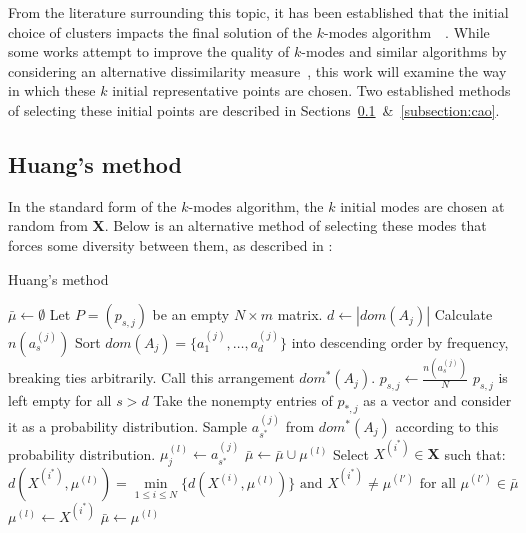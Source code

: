 From the literature surrounding this topic, it has been established that the 
initial choice of clusters impacts the final solution of the \(k\)-modes
algorithm~\cite{Huang98}~\cite{Cao09}. While some works attempt to improve the 
quality of \(k\)-modes and similar algorithms by considering an alternative 
dissimilarity measure~\cite{Ng07}, this work will examine the way in which these
\(k\) initial representative points are chosen. Two established methods of 
selecting these initial points are described in
Sections~\ref{subsection:huang}~\&~\ref{subsection:cao}.


\subsection{Huang's method}\label{subsection:huang}

In the standard form of the \(k\)-modes algorithm, the \(k\) initial modes are 
chosen at random from \textbf{X}. Below is an alternative method of selecting
these modes that forces some diversity between them, as described in 
\cite{Huang98}:

\begin{algorithm}[H]
\caption{Huang's method}\label{alg:huang}
    \begin{algorithmic}[0]
        \State \(\bar{\mu} \gets \emptyset\)
        \State Let \(P = (p_{s,j})\) be an empty \(N \times m\) matrix.
            \State \(d \gets |dom(A_j)|\)
                \State Calculate \(n(a_s^{(j)})\)
	        \EndFor
            \State Sort \(dom(A_j) = \{a_1^{(j)}, \ldots, a_d^{(j)}\}\) into 
                descending order by frequency, breaking ties arbitrarily.
            \State Call this arrangement \(dom^*(A_j)\).
                \State \(p_{s,j} \gets \frac{n(a_s^{(j)})}{N}\)
	        \EndFor
            \State \(p_{s,j}\) is left empty for all \(s > d\)
	    \EndFor
                \State Take the nonempty entries of \(p_{*,j}\) as a vector and 
                    consider it as a probability distribution.
            \State Sample \(a_{s^*}^{(j)}\) from \(dom^*(A_j)\) according to 
                this probability distribution.
            \State \(\mu_j^{(l)} \gets a_{s^*}^{(j)}\)
	        \EndFor
            \State \(\bar{\mu} \gets \bar{\mu} \cup \mu^{(l)}\)
	    \EndFor
            \State Select \(X^{(i^*)} \in \textbf{X}\) such that: 
            \[
                d(X^{(i^*)}, \mu^{(l)}) = \min_{1 \le i \le  N} 
                \{d(X^{(i)}, \mu^{(l)})\} \text{ and } X^{(i^*)} \ne \mu^{(l')}
                \text{ for all } \mu^{(l')} \in \bar{\mu}
            \]
            \State \(\mu^{(l)} \gets X^{(i^*)}\)
            \State \(\bar{\mu} \gets \mu^{(l)}\)
	    \EndFor
    \end{algorithmic}
\end{algorithm} 


